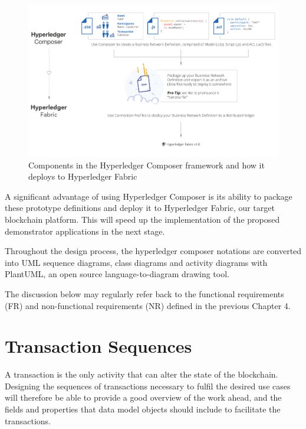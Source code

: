 \begin{figure}[!ht] 
    \centering    
    \includegraphics[width=1.0\textwidth]{composer2fabric}
    \caption[Hyperledger Composer]
        {Components in the Hyperledger Composer framework and how it deploys to 
        Hyperledger Fabric \citep{cuicapuza2017composer}} 
    \label{fig:composer2fabric}
\end{figure}

A significant advantage of using Hyperledger Composer is its ability to package these 
prototype definitions and deploy it to Hyperledger Fabric, our target blockchain platform. 
This will speed up the implementation of the proposed demonstrator applications 
in the next stage.

Throughout the design process, the hyperledger composer notations are converted into UML sequence 
diagrams, class diagrams and activity diagrams with PlantUML, an open source language-to-diagram drawing tool.

The discussion below may regularly refer back to the functional requirements (FR) and 
non-functional requirements (NR) defined in the previous Chapter 4.

\section{Transaction Sequences}

A transaction is the only activity that can alter the state of the blockchain. Designing the 
sequences of transactions necessary to fulfil the desired use cases will therefore be able to 
provide a good overview of the work ahead, and the fields and properties that data model objects 
should include to facilitate the transactions.

